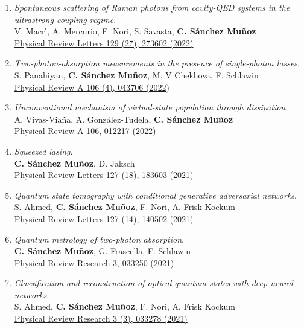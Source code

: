\begin{enumerate}
 \item \emph{Spontaneous scattering of Raman photons from cavity-QED systems in the ultrastrong coupling regime}.\\ 
{V. Macrì, A. Mercurio, F. Nori, S. Savasta, \textbf{C. Sánchez Muñoz}}\\ 
  \href{https://journals.aps.org/prl/abstract/10.1103/PhysRevLett.129.273602}{{Physical Review Letters 129 (27), 273602 (2022)}}

 \item \emph{Two-photon-absorption measurements in the presence of single-photon losses}.\\ 
{S. Panahiyan, \textbf{C. Sánchez Muñoz}, M. V Chekhova, F. Schlawin}\\ 
  \href{https://journals.aps.org/pra/abstract/10.1103/PhysRevA.106.043706}{{Physical Review A 106 (4), 043706 (2022)}}

 \item \emph{Unconventional mechanism of virtual-state population through dissipation}.\\ 
{A. Vivas-Viaña, A. González-Tudela, \textbf{C. Sánchez Muñoz}}\\ 
  \href{https://journals.aps.org/pra/abstract/10.1103/PhysRevA.106.012217}{{Physical Review A 106, 012217 (2022)}}

 \item \emph{Squeezed lasing}.\\ 
{\textbf{C. Sánchez Muñoz}, D. Jaksch}\\ 
  \href{https://journals.aps.org/prl/abstract/10.1103/PhysRevLett.127.183603}{{Physical Review Letters 127 (18), 183603 (2021)}}

 \item \emph{Quantum state tomography with conditional generative adversarial networks}.\\ 
{S. Ahmed, \textbf{C. Sánchez Muñoz}, F. Nori, A. Frisk Kockum}\\ 
  \href{https://journals.aps.org/prl/abstract/10.1103/PhysRevLett.127.140502}{{Physical Review Letters 127 (14), 140502 (2021)}}

 \item \emph{Quantum metrology of two-photon absorption}.\\ 
{\textbf{C. Sánchez Muñoz}, G. Frascella, F. Schlawin}\\ 
  \href{https://journals.aps.org/prresearch/abstract/10.1103/PhysRevResearch.3.033250}{{Physical Review Research 3, 033250 (2021)}}

 \item \emph{Classification and reconstruction of optical quantum states with deep neural networks}.\\ 
{S. Ahmed, \textbf{C. Sánchez Muñoz}, F. Nori, A. Frisk Kockum}\\ 
  \href{https://journals.aps.org/prresearch/abstract/10.1103/PhysRevResearch.3.033278}{{Physical Review Research 3 (3), 033278 (2021)}}


\end{enumerate}
